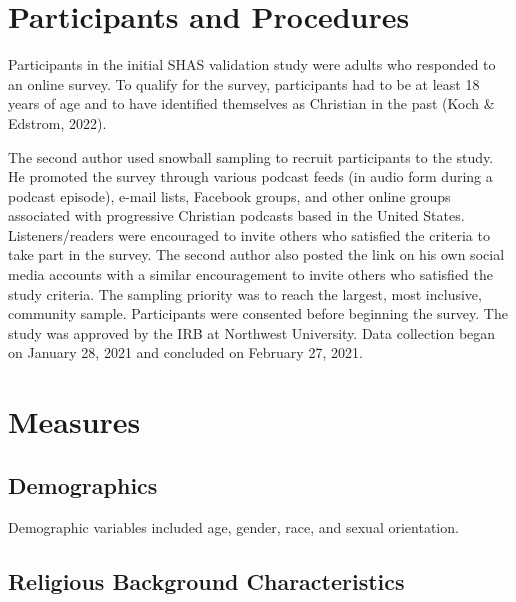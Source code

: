 \documentclass[
  letterpaper,
]{article}
\begin{document}
\section*{Participants and
Procedures}\label{participants-and-procedures}


Participants in the initial SHAS validation study were adults who
responded to an online survey. To qualify for the survey, participants
had to be at least 18 years of age and to have identified themselves as
Christian in the past (Koch \& Edstrom, 2022).

The second author used snowball sampling to recruit participants to the
study. He promoted the survey through various podcast feeds (in audio
form during a podcast episode), e-mail lists, Facebook groups, and other
online groups associated with progressive Christian podcasts based in
the United States. Listeners/readers were encouraged to invite others
who satisfied the criteria to take part in the survey. The second author
also posted the link on his own social media accounts with a similar
encouragement to invite others who satisfied the study criteria. The
sampling priority was to reach the largest, most inclusive, community
sample. Participants were consented before beginning the survey. The
study was approved by the IRB at Northwest University. Data collection
began on January 28, 2021 and concluded on February 27, 2021.

\section*{Measures}\label{measures}


\subsection*{Demographics}\label{demographics}

Demographic variables included age, gender, race, and sexual
orientation.

\subsection*{Religious Background
Characteristics}\label{religious-background-characteristics}
\end{document}
